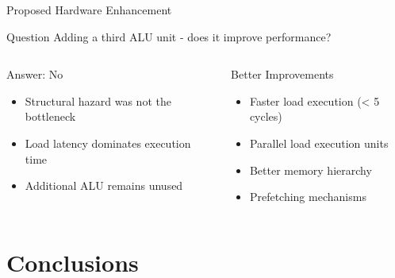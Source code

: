 \documentclass[aspectratio=169,12pt]{beamer}
\begin{document}
\begin{frame}{Proposed Hardware Enhancement}
\begin{block}{Question}
Adding a third ALU unit - does it improve performance?
\end{block}

\begin{columns}
\begin{block}{Answer: No}
\begin{itemize}
    \item Structural hazard was not the bottleneck
    \item Load latency dominates execution time
    \item Additional ALU remains unused
\end{itemize}
\end{block}

\begin{block}{Better Improvements}
\begin{itemize}
    \item Faster load execution (< 5 cycles)
    \item Parallel load execution units
    \item Better memory hierarchy
    \item Prefetching mechanisms
\end{itemize}
\end{block}
\end{columns}
\end{frame}

\section{Conclusions}
\end{document}
